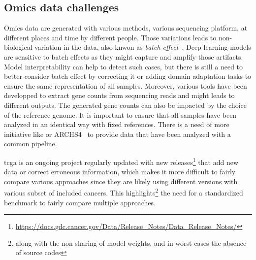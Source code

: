 \documentclass[../main.tex]{subfiles}
\begin{document}
	\subsection{Omics data challenges}
		Omics data are generated with various methods, various sequencing platform, at different places and time by different people.
		Those variations leads to non-biological variation in the data, also knwon as \emph{batch effect}~\cite{Leek2010}.
		Deep learning models are sensitive to batch effects as they might capture and amplify those artifacts.
		Model interpretability can help to detect such cases, but there is still a need to better consider batch effect by correcting it or adding domain adaptation tasks to ensure the same representation of all samples.
		Moreover, various tools have been developped to extract gene counts from sequencing reads and might leads to different outputs.
		The generated gene counts can also be impacted by the choice of the reference genome.
		It is important to ensure that all samples have been analyzed in an identical way with fixed references.
		There is a need of more initiative like  or ARCHS4~\cite{Lachmann2018} to provide data that have been analyzed with a common pipeline.

		\Gls{tcga} is an ongoing project regularly updated with new releases\footnote{\url{https://docs.gdc.cancer.gov/Data/Release_Notes/Data_Release_Notes/}} that add new data or correct erroneous information, which makes it more difficult to fairly compare various approaches since they are likely using different versions with various subset of included cancers.
		This highlights\footnote{along with the non sharing of model weights, and in worst cases the absence of source codes} the need for a standardized benchmark to fairly compare multiple approaches.
\end{document}
